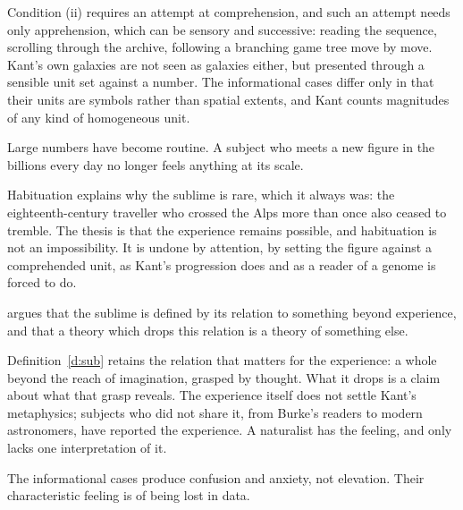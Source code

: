 \documentclass{situationist-preprint}
\begin{document}
\begin{reply}
Condition (ii) requires an attempt at comprehension, and such an attempt needs only apprehension, which can be sensory and successive: reading the sequence, scrolling through the archive, following a branching game tree move by move. Kant's own galaxies are not seen as galaxies either, but presented through a sensible unit set against a number. The informational cases differ only in that their units are symbols rather than spatial extents, and Kant counts magnitudes of any kind of homogeneous unit.
\end{reply}

\begin{objection}[Familiarity]
Large numbers have become routine. A subject who meets a new figure in the billions every day no longer feels anything at its scale.
\end{objection}

\begin{reply}
Habituation explains why the sublime is rare, which it always was: the eighteenth-century traveller who crossed the Alps more than once also ceased to tremble. The thesis is that the experience remains possible, and habituation is not an impossibility. It is undone by attention, by setting the figure against a comprehended unit, as Kant's progression does and as a reader of a genome is forced to do.
\end{reply}

\begin{objection}
\citet{Forsey2007} argues that the sublime is defined by its relation to something beyond experience, and that a theory which drops this relation is a theory of something else.
\end{objection}

\begin{reply}
Definition~\ref{d:sub} retains the relation that matters for the experience: a whole beyond the reach of imagination, grasped by thought. What it drops is a claim about what that grasp reveals. The experience itself does not settle Kant's metaphysics; subjects who did not share it, from Burke's readers to modern astronomers, have reported the experience. A naturalist has the feeling, and only lacks one interpretation of it.
\end{reply}

\begin{objection}
The informational cases produce confusion and anxiety, not elevation. Their characteristic feeling is of being lost in data.
\end{objection}
\end{document}
